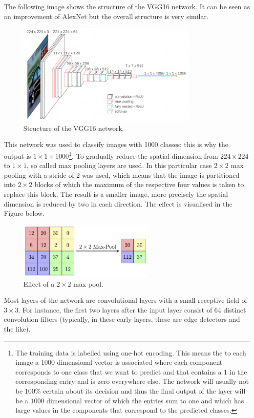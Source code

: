 The following image shows the structure of the VGG16 network. It can be seen as
an improvement of AlexNet but the overall structure is very similar.
\begin{figure}[H]
  \centering \includegraphics[width=0.8\textwidth]{Figures/vgg16}
  \caption{Structure of the VGG16 network.}%
  \label{fig:vgg16}
\end{figure}
This network was used to classify images with 1000 classes; this is why the
output is $1 \times 1 \times 1000$\footnote{The training data is labelled using
  one-hot encoding. This means the to each image a $1000$ dimensional vector is
  associated where each component corresponds to one class that we want to
  predict and that contains a $1$ in the corresponding entry and is zero
  everywhere else. The network will usually not be 100\% certain about its
  decision and thus the final output of the layer will be a $1000$ dimensional
  vector of which the entries sum to one and which has large values in the
  components that correspond to the predicted classes.}. To gradually reduce the
spatial dimension from $224 \times 224$ to $1 \times 1$, so called max pooling
layers are used.  In this particular case $2 \times 2$ max pooling with a stride
of $2$ was used, which means that the image is partitioned into $2 \times 2$
blocks of which the maximum of the respective four values is taken to replace
this block. The result is a smaller image, more precisely the spatial dimension
is reduced by two in each direction. The effect is visualised in the Figure
below.
\begin{figure}[H]
  \centering \includegraphics[width=0.6\textwidth]{Figures/maxpool}
  \caption{Effect of a $2 \times 2$ max pool.}%
  \label{fig:maxpool}
\end{figure}
Most layers of the network are convolutional layers with a small receptive field
of $3 \times 3$. For instance, the first two layers after the input layer
consist of 64 distinct convolution filters (typically, in these early layers,
these are edge detectors and the like).


